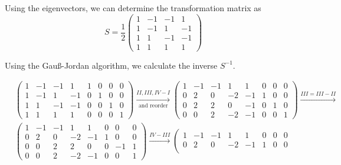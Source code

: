\documentclass[a4paper,german,12pt,smallheadings]{scrartcl}
\begin{document}
\begin{enumerate}[a)]
    Using the eigenvectors, we can determine the transformation matrix as
    \begin{equation*}
      S = \frac{1}{2}
      \begin{pmatrix}
        1 & -1 & -1 & 1 \\
        1 & -1 & 1 & -1 \\
        1 & 1 & -1 & -1 \\
        1 & 1 & 1 & 1
      \end{pmatrix}
    \end{equation*}

    Using the Gauß-Jordan algorithm, we calculate the inverse $S^{-1}$.

    \begin{align*}
      &\left(
        \begin{array}{cccc|cccc}
          1 & -1 & -1 &  1   &   1 & 0 & 0 & 0 \\
          1 & -1 &  1 & -1   &   0 & 1 & 0 & 0 \\
          1 &  1 & -1 & -1   &   0 & 0 & 1 & 0 \\
          1 &  1 &  1 &  1   &   0 & 0 & 0 & 1
        \end{array}
      \right)
      \xrightarrow[\text{and reorder}]{II, III, IV - I}
      \left(
        \begin{array}{cccc|cccc}
          1 & -1 & -1 &  1   &    1 & 0 & 0 & 0 \\
          0 &  2 &  0 & -2   &   -1 & 1 & 0 & 0 \\
          0 &  2 &  2 &  0   &   -1 & 0 & 1 & 0 \\
          0 &  0 &  2 & -2   &   -1 & 0 & 0 & 1
        \end{array}
      \right)
      \xrightarrow{III = III - II}
      \\
      &\left(
        \begin{array}{cccc|cccc}
          1 & -1 & -1 &  1   &    1 & 0 & 0  & 0 \\
          0 &  2 &  0 & -2   &   -1 & 1 & 0  & 0 \\
          0 &  0 &  2 &  2   &    0 & 0 & -1 & 1 \\
          0 &  0 &  2 & -2   &   -1 & 0 & 0  & 1
        \end{array}
      \right)
      \xrightarrow{IV - III}
      \left(
        \begin{array}{cccc|cccc}
          1 & -1 & -1 &  1   &    1 & 0 & 0  & 0 \\
          0 &  2 &  0 & -2   &   -1 & 1 & 0  & 0 \\

\end{array}
\end{align*}
\end{enumerate}
\end{document}
